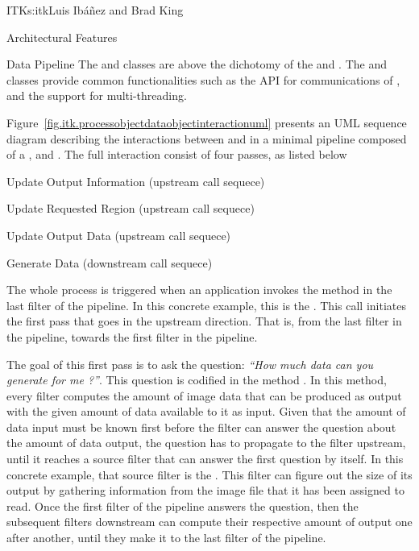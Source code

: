 \begin{aosachapter}{ITK}{s:itk}{Luis Ib\'{a}\~{n}ez and Brad King}
\begin{aosasect1}{Architectural Features}
\begin{aosasect2}{Data Pipeline}
The  and  classes are above the
dichotomy of the  and . The
 and  classes provide common
functionalities such as the API for communications of ,
and the support for multi-threading.



Figure~\ref{fig.itk.processobjectdataobjectinteractionuml} presents an UML
sequence diagram describing the interactions between  and
 in a minimal pipeline composed of a ,
 and . The full interaction
consist of four passes, as listed below

\begin{aosaitemize}
\item Update Output Information (upstream call sequece)
\item Update Requested Region (upstream call sequece)
\item Update Output Data (upstream call sequece)
\item Generate Data (downstream call sequece)
\end{aosaitemize}

The whole process is triggered when an application invokes the 
method in the last filter of the pipeline. In this concrete example, this is
the . This  call initiates the first pass
that goes in the upstream direction. That is, from the last filter in the
pipeline, towards the first filter in the pipeline.

The goal of this first pass is to ask the question: \emph{``How much data can
you generate for me ?''}. This question is codified in the method
. In this method, every filter computes the
amount of image data that can be produced as output with the given amount of
data available to it as input. Given that the amount of data input must be
known first before the filter can answer the question about the amount of data
output, the question has to propagate to the filter upstream, until it reaches
a source filter that can answer the first question by itself. In this concrete
example, that source filter is the . This filter can
figure out the size of its output by gathering information from the image file
that it has been assigned to read. Once the first filter of the pipeline
answers the question, then the subsequent filters downstream can compute their
respective amount of output one after another, until they make it to the last
filter of the pipeline.


\end{aosasect2}
\end{aosasect1}
\end{aosachapter}
